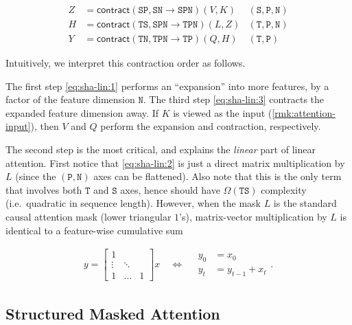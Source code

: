 \begin{subequations}
  \label{eq:sha-lin}
  \begin{align}
    \label{eq:sha-lin:1}
    Z &= \mathsf{contract}(\mathtt{SP},\mathtt{SN} \to \mathtt{SPN})(V, K) & \mathtt{(S,P,N)} \\
    \label{eq:sha-lin:2}
    H &= \mathsf{contract}(\mathtt{TS},\mathtt{SPN} \to \mathtt{TPN})(L, Z) & \mathtt{(T,P,N)} \\
    \label{eq:sha-lin:3}
    Y &= \mathsf{contract}(\mathtt{TN},\mathtt{TPN} \to \mathtt{TP})(Q, H) & \mathtt{(T,P)}
  \end{align}
\end{subequations}

Intuitively, we interpret this contraction order as follows.

The first step \eqref{eq:sha-lin:1} performs an ``expansion'' into more features, by a factor of the feature dimension $\mathtt{N}$.
The third step \eqref{eq:sha-lin:3} contracts the expanded feature dimension away. If $K$ is viewed as the input (\ref{rmk:attention-input}),
then $V$ and $Q$ perform the expansion and contraction, respectively.

The second step is the most critical, and explains the \emph{linear} part of linear attention. First notice that \eqref{eq:sha-lin:2} is just a direct matrix multiplication by $L$ (since the $\mathtt{(P,N)}$ axes can be flattened). Also note that this is the only term that involves both $\mathtt{T}$ and $\mathtt{S}$ axes, hence should have $\Omega(\mathtt{TS})$ complexity (i.e.\ quadratic in sequence length). However, when the mask $L$ is the standard causal attention mask (lower triangular $1$'s), matrix-vector multiplication by $L$ is identical to a feature-wise cumulative sum

\begin{align*}
  y = \begin{bmatrix} 1 \\ \vdots & \ddots \\ 1 & \dots & 1 \end{bmatrix} x \quad\iff\quad
  \begin{aligned}
    y_0 &= x_0 \\
    y_t &= y_{t-1} + x_t
  \end{aligned}
  .
\end{align*}

\subsection{Structured Masked Attention}
\label{sec:structured-attention}

